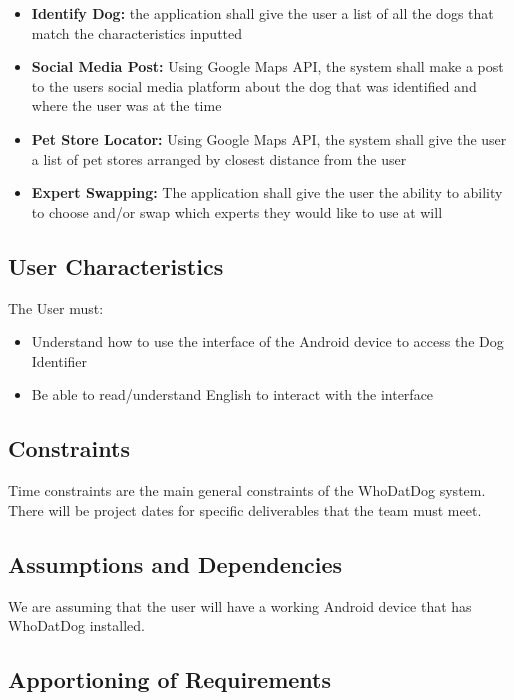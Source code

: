 \documentclass[]{article}
\begin{document}
\begin{itemize}
	\item \textbf{Identify Dog:} the application shall give the user a list of all the dogs that match the characteristics inputted
	\item \textbf{Social Media Post:} Using Google Maps API, the system shall make a post to the users social media platform about the dog that was identified and where the user was at the time
	\item \textbf{Pet Store Locator:} Using Google Maps API, the system shall give the user a list of pet stores arranged by closest distance from the user
	\item \textbf{Expert Swapping:} The application shall give the user the ability to ability to choose and/or swap which experts they would like to use at will
\end{itemize}

\subsection{User Characteristics}
\label{sub:user_characteristics}
The User must:
\begin{itemize}
	\item Understand how to use the interface of the Android device to access the Dog Identifier
	\item Be able to read/understand English to interact with the interface
\end{itemize}

\subsection{Constraints}
\label{sub:constraints}
Time constraints are the main general constraints of the WhoDatDog system. There will be project dates for specific deliverables that the team must meet.

\subsection{Assumptions and Dependencies}
\label{sub:assumptions_and_dependencies}
We are assuming that the user will have a working Android device that has WhoDatDog installed.

\subsection{Apportioning of Requirements}
\label{sub:apportioning_of_requirements}
\end{document}
